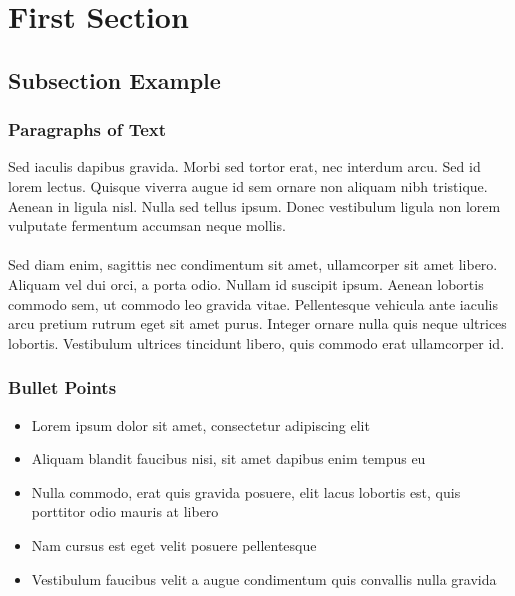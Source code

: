 \documentclass{beamer}
\begin{document}


\section{First Section} %

\subsection{Subsection Example} %

\begin{frame}
\frametitle{Paragraphs of Text}
Sed iaculis dapibus gravida. Morbi sed tortor erat, nec interdum arcu. Sed id lorem lectus. Quisque viverra augue id sem ornare non aliquam nibh tristique. Aenean in ligula nisl. Nulla sed tellus ipsum. Donec vestibulum ligula non lorem vulputate fermentum accumsan neque mollis.\\~\\

Sed diam enim, sagittis nec condimentum sit amet, ullamcorper sit amet libero. Aliquam vel dui orci, a porta odio. Nullam id suscipit ipsum. Aenean lobortis commodo sem, ut commodo leo gravida vitae. Pellentesque vehicula ante iaculis arcu pretium rutrum eget sit amet purus. Integer ornare nulla quis neque ultrices lobortis. Vestibulum ultrices tincidunt libero, quis commodo erat ullamcorper id.
\end{frame}


\begin{frame}
\frametitle{Bullet Points}
\begin{itemize}
\item Lorem ipsum dolor sit amet, consectetur adipiscing elit
\item Aliquam blandit faucibus nisi, sit amet dapibus enim tempus eu
\item Nulla commodo, erat quis gravida posuere, elit lacus lobortis est, quis porttitor odio mauris at libero
\item Nam cursus est eget velit posuere pellentesque
\item Vestibulum faucibus velit a augue condimentum quis convallis nulla gravida
\end{itemize}
\end{frame}
\end{document}
